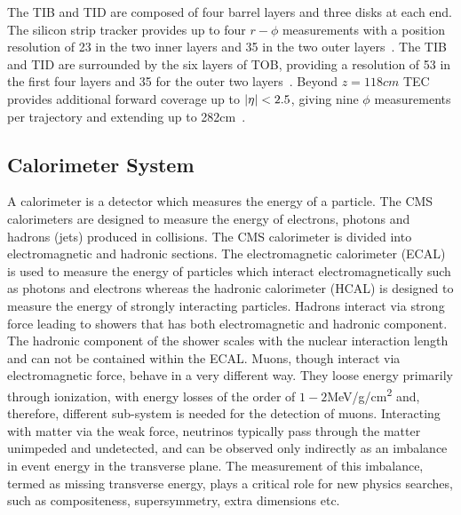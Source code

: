 The TIB and TID are composed of four barrel layers and three disks at each end. The silicon strip tracker provides up to four $r-\phi$ measurements 
with a position resolution of 23\unit{} in the two inner layers and 35\unit{} in the two outer layers~\cite{Chatrchyan:2008aa}. The TIB 
and TID are surrounded by the six layers of TOB, providing a resolution of 53\unit{} in the first four layers and 35\unit{} for the outer 
two layers~\cite{Chatrchyan:2008aa}. Beyond $z=118\unit{cm}$ TEC provides additional forward coverage up to $\lvert \eta \rvert<2.5$, giving nine $\phi$ 
measurements per trajectory and extending up to 282\unit{cm}~\cite{Chatrchyan:2008aa}.

\subsection{Calorimeter System}
A calorimeter is a detector which measures the energy of a particle. The CMS calorimeters are designed to measure the energy of electrons, photons 
and hadrons (jets) produced in collisions. The CMS calorimeter is divided into electromagnetic and hadronic sections. The electromagnetic calorimeter 
(\gls{ECAL}) is used to measure the energy of particles which interact electromagnetically such as photons and electrons whereas the hadronic calorimeter 
(\gls{HCAL}) is designed to measure the energy of strongly interacting particles. Hadrons interact via strong force leading to showers that has both 
electromagnetic and hadronic component. The hadronic component of the shower scales with the nuclear interaction length and can not be contained 
within the ECAL. Muons, though interact via electromagnetic force, behave in a very different way. They loose energy primarily through ionization,
with energy losses of the order of $1-2$\unit{MeV/g/cm^{2}} and, therefore, different sub-system is needed for the detection of muons. 
Interacting with matter via the weak force, neutrinos typically pass through the matter unimpeded and undetected, and can be observed only indirectly 
as an imbalance in event energy in the transverse plane. The measurement of this imbalance, termed as missing transverse energy, plays a critical 
role for new physics searches, such as compositeness, supersymmetry, extra dimensions etc.


